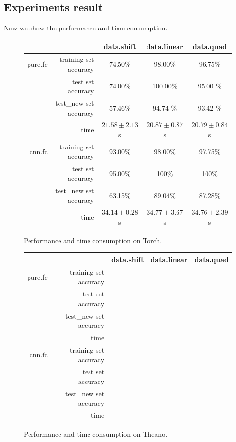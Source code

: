 \documentclass[a4paper]{article}
\begin{document}
\subsection{Experiments result}

Now we show the performance and time consumption.

\begin{figure}[H]
\centering
\begin{tabular}{|r|r|c|c|c|}
\hline
 & & data.shift & data.linear & data.quad \\
\hline
pure.fc & training set accuracy & 74.50\% & 98.00\% & 96.75\% \\
 & test set accuracy & 74.00\% & 100.00\% & 95.00 \% \\
 & test\_new set accuracy & 57.46\% & 94.74 \% & 93.42 \%\\
 & time & $21.58 \pm 2.13$ s & $20.87 \pm 0.87$ s & $20.79 \pm 0.84$ s\\
\hline
cnn.fc & training set accuracy & 93.00\% & 98.00\% &97.75\%\\
 & test set accuracy & 95.00\% &100\% &100\%\\
 & test\_new set accuracy & 63.15\% & 89.04\% &87.28\%\\
 & time & $34.14 \pm 0.28$s & $34.77 \pm 3.67$s & $34.76 \pm 2.39$s\\
\hline
\end{tabular}
\caption{Performance and time consumption on Torch.}
\end{figure}

\begin{figure}[H]
\centering
\begin{tabular}{|r|r|c|c|c|}
\hline
 & & data.shift & data.linear & data.quad \\
\hline
pure.fc & training set accuracy & \\
 & test set accuracy & \\
 & test\_new set accuracy & \\
 & time & \\
\hline
cnn.fc & training set accuracy & \\
 & test set accuracy & \\
 & test\_new set accuracy & \\
 & time & \\
\hline
\end{tabular}
\caption{Performance and time consumption on Theano.}
\end{figure}
\end{document}
